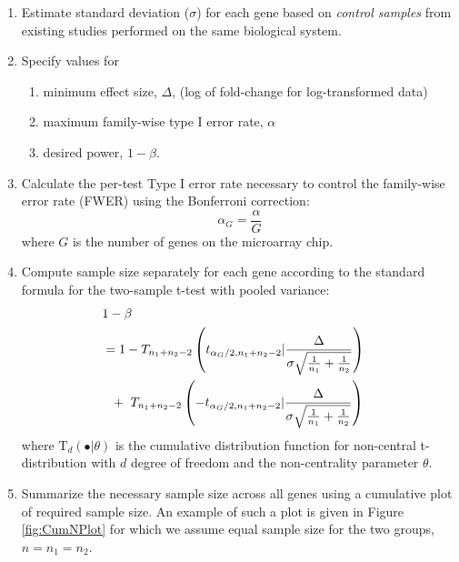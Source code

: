 \documentclass{bioinfo}
\begin{document}
\begin{enumerate}
\item{Estimate standard deviation ($\sigma$) for each gene based on
    \emph{control samples} from existing studies performed on the
    same biological system.}

\item{Specify values for
    \begin{enumerate}
    \item minimum effect size, $\Delta$, (log of fold-change for log-transformed data)
    \item maximum family-wise type I error rate, $\alpha$
    \item desired power, $1 - \beta$.
    \end{enumerate}
  }

\item{Calculate the per-test Type I error rate necessary to control
    the family-wise error rate (FWER) using the Bonferroni correction:}
\begin{equation}
  \alpha_G = \frac{\alpha}{G}
\end{equation}
%
where $G$ is the number of genes on the microarray chip.

\item{Compute sample size separately for each gene according to the
    standard formula for the two-sample t-test with pooled variance:}
  \begin{eqnarray}
    \lefteqn{1-\beta} \nonumber \\
    &= 1-T_{n_1+n_2-2} \left( t_{\alpha_G/2,n_1+n_2-2} | \frac{\Delta}{\sigma \sqrt{\frac{1}{n_1} + \frac{1}{n_2}}}\right) \nonumber \\
    &  ~~+~T_{n_1+n_2-2} \left( -t_{\alpha_G/2,n_1+n_2-2} | \frac{\Delta}{\sigma \sqrt{\frac{1}{n_1} + \frac{1}{n_2}}}\right)
    \label{eq:formula}
  \end{eqnarray}
  where $\mathrm{T}_{d}(\bullet|\theta)$ is the cumulative
  distribution function for non-central t-distribution with $d$ degree
  of freedom and the non-centrality parameter $\theta$.

\item{Summarize the necessary sample size across all genes using a
      cumulative plot of required sample size. An example of such a
      plot is given in Figure \ref{fig:CumNPlot} for which we assume equal sample size for the two groups, $n = n_1 = n_2$.}

\end{enumerate}
\end{document}
